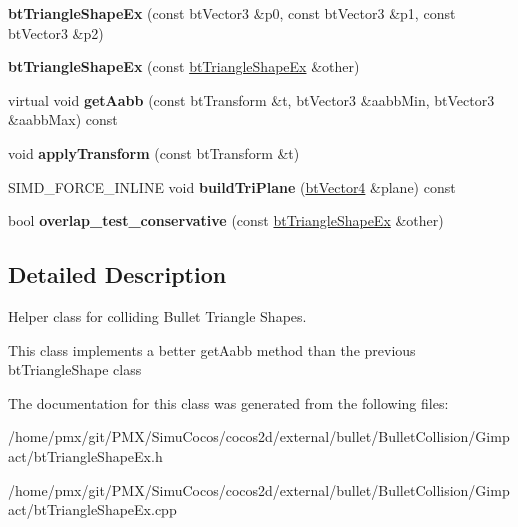 \begin{DoxyCompactItemize}
{\bfseries bt\+Triangle\+Shape\+Ex} (const bt\+Vector3 \&p0, const bt\+Vector3 \&p1, const bt\+Vector3 \&p2)
\item 
\mbox{\label{classbtTriangleShapeEx_ab138dd8e1b438d7fd94a1b1ec91ae439}} 
{\bfseries bt\+Triangle\+Shape\+Ex} (const \hyperlink{classbtTriangleShapeEx}{bt\+Triangle\+Shape\+Ex} \&other)
\item 
\mbox{\label{classbtTriangleShapeEx_a90a9a3a12e7870debb747b63c5335249}} 
virtual void {\bfseries get\+Aabb} (const bt\+Transform \&t, bt\+Vector3 \&aabb\+Min, bt\+Vector3 \&aabb\+Max) const
\item 
\mbox{\label{classbtTriangleShapeEx_a7d4d509262b012617f76b05d531a64a7}} 
void {\bfseries apply\+Transform} (const bt\+Transform \&t)
\item 
\mbox{\label{classbtTriangleShapeEx_a49ee86b4942340a3b3141a7044337113}} 
S\+I\+M\+D\+\_\+\+F\+O\+R\+C\+E\+\_\+\+I\+N\+L\+I\+NE void {\bfseries build\+Tri\+Plane} (\hyperlink{classbtVector4}{bt\+Vector4} \&plane) const
\item 
\mbox{\label{classbtTriangleShapeEx_a8642843da440361eecf27d5a074d6231}} 
bool {\bfseries overlap\+\_\+test\+\_\+conservative} (const \hyperlink{classbtTriangleShapeEx}{bt\+Triangle\+Shape\+Ex} \&other)
\end{DoxyCompactItemize}


\subsection{Detailed Description}
Helper class for colliding Bullet Triangle Shapes. 

This class implements a better get\+Aabb method than the previous bt\+Triangle\+Shape class 

The documentation for this class was generated from the following files\+:\begin{DoxyCompactItemize}
\item 
/home/pmx/git/\+P\+M\+X/\+Simu\+Cocos/cocos2d/external/bullet/\+Bullet\+Collision/\+Gimpact/bt\+Triangle\+Shape\+Ex.\+h\item 
/home/pmx/git/\+P\+M\+X/\+Simu\+Cocos/cocos2d/external/bullet/\+Bullet\+Collision/\+Gimpact/bt\+Triangle\+Shape\+Ex.\+cpp\end{DoxyCompactItemize}
